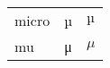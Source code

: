 \documentclass{unittest}
\begin{document}
\begin{tabular}{lll}\toprule
micro & µ & $µ$ \\
mu    & μ & $μ$ \\
\end{tabular}
\end{document}
